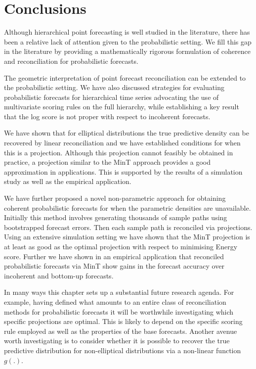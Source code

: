 \documentclass[12pt]{article}
\theoremstyle{definition}
\begin{document}
\section{Conclusions}\label{sec:conclusions_chap3}

Although hierarchical point forecasting is well studied in the literature, there has been a relative lack of attention given to the probabilistic setting. We fill this gap in the literature by providing a mathematically rigorous formulation of coherence and reconciliation for probabilistic forecasts.

The geometric interpretation of point forecast reconciliation can be extended to the probabilistic setting. We have also discussed strategies for evaluating probabilistic forecasts for hierarchical time series advocating the use of multivariate scoring rules on the full hierarchy, while establishing a key result that the log score is not proper with respect to incoherent forecasts.

We have shown that for elliptical distributions the true predictive density can be recovered by linear reconciliation and we have established conditions for when this is a projection. Although this projection cannot feasibly be obtained in practice, a projection similar to the MinT approach provides a good approximation in applications. This is supported by the results of a simulation study as well as the empirical application.

We have further proposed a novel non-parametric approach for obtaining coherent probabilistic forecasts for when the parametric densities are unavailable. Initially this method involves generating thousands of sample paths using bootstrapped forecast errors. Then each sample path is reconciled via projections. Using an extensive simulation setting we have shown that the MinT projection is at least as good as the optimal projection with respect to minimising Energy score. Further we have shown in an empirical application that reconciled probabilistic forecasts via MinT show gains in the forecast accuracy over incoherent and bottom-up forecasts.


In many ways this chapter sets up a substantial future research agenda. For example, having defined what amounts to an entire class of reconciliation methods for probabilistic forecasts it will be worthwhile investigating which specific projections are optimal. This is likely to depend on the specific scoring rule employed as well as the properties of the base forecasts. Another avenue worth investigating is to consider whether it is possible to recover the true predictive distribution for non-elliptical distributions via a non-linear function $g(.)$.
\end{document}
